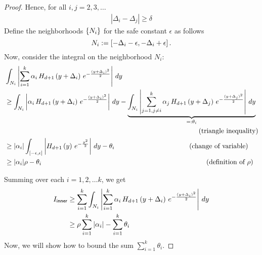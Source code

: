 \begin{proof}
    Hence, for all $i,j = 2, 3, \ldots$
    \begin{align*}
        |\Delta_i - \Delta_j| \ge \delta
    \end{align*}
    Define the neighborhoods $\curlybracket{N_i}$ for the safe constant $\epsilon$ as follows
    $$N_i := \bracket{-\Delta_i - \epsilon, -\Delta_i + \epsilon}.$$
    Now, consider the integral on the neighborhood $N_i$:
    \begin{align*}
        &\int_{N_i} \left| \sum_{i=1}^k \alpha_i \, H_{d+1}\left( y + \Delta_i \right) \, e^{ -\frac{(y + \Delta_i)^2}{2} } \right| \, dy \\
        &\ge \int_{N_i} \left|\alpha_i \, H_{d+1}\left( y + \Delta_i \right) \, e^{ -\frac{(y + \Delta_i)^2}{2} } \right| \, dy - \underbrace{\int_{N_i} \left| \sum_{j=1, j \neq i}^k \alpha_j \, H_{d+1}\left( y + \Delta_j \right) \, e^{ -\frac{(y + \Delta_j)^2}{2} } \right| \, dy}_{=: \large{\theta_i}}\\ 
        &\hspace{100mm}\text{(triangle inequality)}\\
        &\ge |\alpha_i| \int_{[-\epsilon,\epsilon]} \left|H_{d+1}\left( y \right) \, e^{ -\frac{y^2}{2} } \right| \, dy - \theta_i \hspace{38.5mm}\text{(change of variable)} \\ 
        &\ge |\alpha_i| \rho - \theta_i \hspace{85mm}\text{(definition of $\rho$)}
    \end{align*}

    Summing over each $i = 1, 2, \ldots k$, we get
    \begin{align}
        I_{\sf{inner}} &\ge \sum_{i = 1}^k \int_{N_i} \left| \sum_{i=1}^k \alpha_i \, H_{d+1}\left( y + \Delta_i \right) \, e^{ -\frac{(y + \Delta_i)^2}{2} } \right| \, dy \nonumber\\
        & \ge \rho \sum_{i=1}^k |\alpha_i| - \sum_{i=1}^k \theta_i \label{eq: diff}
    \end{align}
    Now, we will show how to bound the sum $\sum_{i=1}^k \theta_i$.%

\end{proof}
